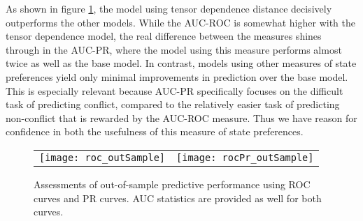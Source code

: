 As shown in figure \ref{fig:roc}, the model using tensor dependence distance decisively outperforms the other models. While the AUC-ROC is somewhat higher with the tensor dependence model, the real difference between the measures shines through in the AUC-PR, where the model using this measure performs almost twice as well as the base model. In contrast, models using other measures of state preferences yield only minimal improvements in prediction over the base model. This is especially relevant because AUC-PR specifically focuses on the difficult task of predicting conflict, compared to the relatively easier task of predicting non-conflict that is rewarded by the AUC-ROC measure. Thus we have reason for confidence in both the usefulness of this measure of state preferences. 

\begin{figure}[ht]
	\centering
	\begin{tabular}{cc}
	\texttt{[image: roc\_outSample]} & 
	\texttt{[image: rocPr\_outSample]}	
	\end{tabular}
	\caption{Assessments of out-of-sample predictive performance using ROC curves and PR curves. AUC statistics are provided as well for both curves.}
	\label{fig:roc}
\end{figure}
\FloatBarrier
